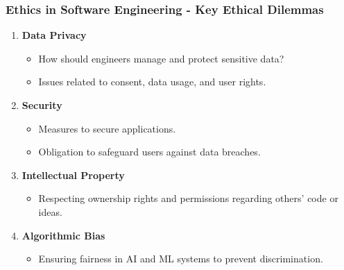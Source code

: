 \documentclass{beamer}
\begin{document}
\begin{frame}[fragile]
    \frametitle{Ethics in Software Engineering - Key Ethical Dilemmas}
    \begin{enumerate}
        \item \textbf{Data Privacy}
            \begin{itemize}
                \item How should engineers manage and protect sensitive data?
                \item Issues related to consent, data usage, and user rights.
            \end{itemize}
        \item \textbf{Security}
            \begin{itemize}
                \item Measures to secure applications.
                \item Obligation to safeguard users against data breaches.
            \end{itemize}
        \item \textbf{Intellectual Property}
            \begin{itemize}
                \item Respecting ownership rights and permissions regarding others' code or ideas.
            \end{itemize}
        \item \textbf{Algorithmic Bias}
            \begin{itemize}
                \item Ensuring fairness in AI and ML systems to prevent discrimination.
            \end{itemize}
    \end{enumerate}
\end{frame}
\end{document}
